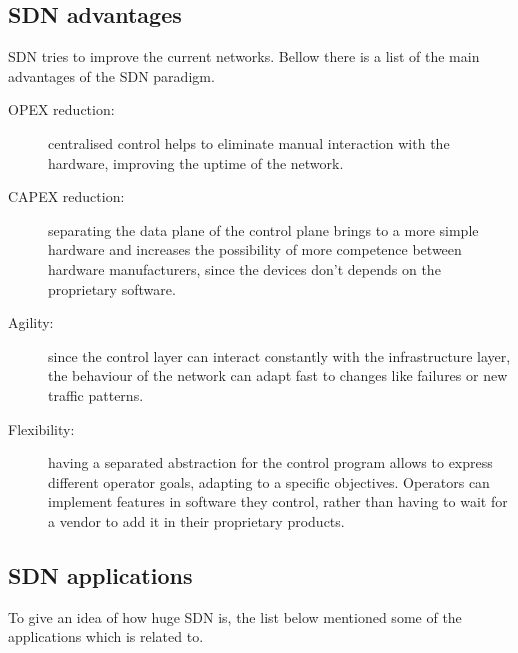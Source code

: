 


\subsection{SDN advantages\\}

SDN tries to improve the current networks. Bellow there is a list of the main advantages of the SDN paradigm.\\

\begin{description}
\item[OPEX reduction:] centralised control helps to eliminate manual interaction with the hardware, improving the uptime of the network. 
\item[CAPEX reduction:] separating the data plane of the control plane brings to a more simple hardware and increases the possibility of more competence between hardware manufacturers, since the devices don't depends on the proprietary software.
\item[Agility:] since the control layer can interact constantly with the infrastructure layer, the behaviour of the network can adapt fast to changes like failures or new traffic patterns. 
\item[Flexibility:] having a separated abstraction for the control program allows to express different operator goals, adapting to a specific objectives. Operators can implement features in software they control, rather than having to wait for a vendor to add it in their proprietary products.\\
\end{description}



\subsection{SDN applications\\}

To give an idea of how huge SDN is, the list below mentioned some of the applications which is related to.\\

